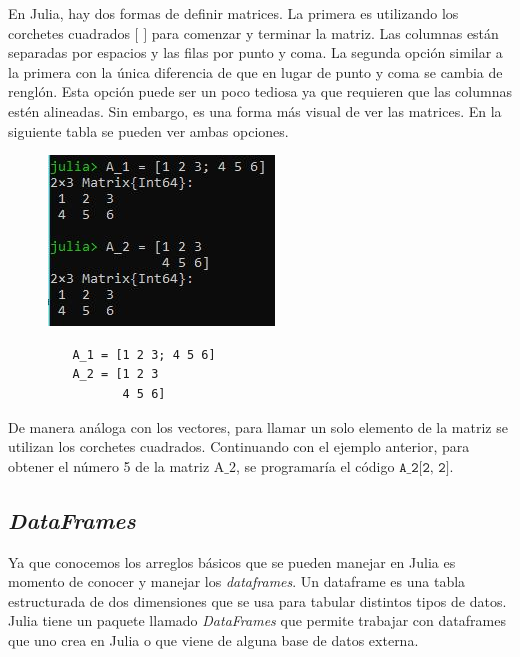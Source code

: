 En Julia, hay dos formas de definir matrices. La primera es utilizando los corchetes cuadrados $[$ $]$ para comenzar y terminar la matriz. Las columnas están separadas por espacios y las filas por punto y coma. La segunda opción similar a la primera con la única diferencia de que en lugar de punto y coma se cambia de renglón. Esta opción puede ser un poco tediosa ya que requieren que las columnas estén alineadas. Sin embargo, es una forma más visual de ver las matrices. En la siguiente tabla se pueden ver ambas opciones. 

\begin{figure}[h]
\begin{center}
\includegraphics[scale=0.8]{Imagenes/definir_matrices.JPG}
  \label{definicion_matrices}
\end{center}
\end{figure}

\begin{tcolorbox}
      \begin{verbatim}
         A_1 = [1 2 3; 4 5 6]
         A_2 = [1 2 3 
                4 5 6]
      \end{verbatim}
\end{tcolorbox}

De manera análoga con los vectores, para llamar un solo elemento de la matriz se utilizan los corchetes cuadrados. Continuando con el ejemplo anterior, para obtener el número 5 de la matriz $\text{A\_2}$, se programaría el código $\texttt{A\_2[2, 2]}$.



\subsection{\textit{DataFrames}}
Ya que conocemos los arreglos básicos que se pueden manejar en Julia es momento de conocer y manejar los \textit{dataframes}. Un dataframe es una tabla estructurada de dos dimensiones que se usa para tabular distintos tipos de datos. Julia tiene un paquete llamado \textit{DataFrames}  que permite trabajar con dataframes que uno crea en Julia o que viene de alguna base de datos externa. 

